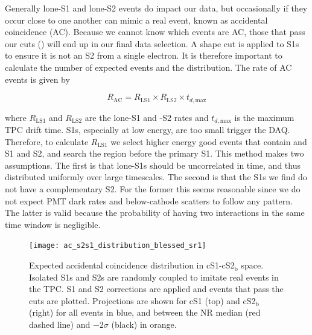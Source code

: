 Generally lone-S1 and lone-S2 events do impact our data, but occasionally if they occur close to one another can mimic a real event, known
as accidental coincidence (AC).  Because we cannot know which events are AC, those that pass our cuts 
() will end up in our final data
selection.  A shape cut is applied to S1s to ensure it is not an S2 from a single electron.  It is therefore important to calculate the
number of expected events and the distribution.  The rate of AC events is given by

\begin{equation}
R_{\mathrm{AC}} = R_{\mathrm{LS1}} \times R_{\mathrm{LS2}} \times t_{d, \mathrm{max}}
\label{eq:er_nr_calibrations_parameter_determ_additional_components_accidental_coincidence}
\end{equation}

\noindent where $R_{\mathrm{LS1}}$ and $R_{\mathrm{LS2}}$ are the lone-S1
and -S2 rates and $t_{d, \mathrm{max}}$ is the maximum TPC drift time.  S1s, especially at low energy, are too small trigger the
DAQ.  Therefore, to calculate $R_{\mathrm{LS1}}$ we select higher energy good events that contain and S1 and S2, and search the region
before the primary S1.  This method makes two assumptions.  The first is that lone-S1s should be uncorrelated in time, and thus
distributed uniformly over large timescales.  The second is that the S1s we find do not have a complementary S2.  For the former this
seems reasonable since we do not expect PMT dark rates and below-cathode scatters to follow any pattern.  The latter is valid because
the probability of having two interactions in the same time window is negligible.

\begin{figure}
\centering
\texttt{[image: ac\_s2s1\_distribution\_blessed\_sr1]}
\caption{Expected accidental coincidence distribution in cS1-cS2$_{\mathrm{b}}$ space.  Isolated S1s and S2s are randomly coupled to
imitate real events in the TPC.  S1 and S2 corrections are applied and events that pass the cuts are plotted.  Projections are
shown for cS1 (top) and cS2$_{\mathrm{b}}$ (right) for all events in blue, and between the NR median (red dashed line) and
$-2 \sigma$ (black) in orange.}
\label{fig:er_nr_calibrations_parameter_determ_ac}
\end{figure}

